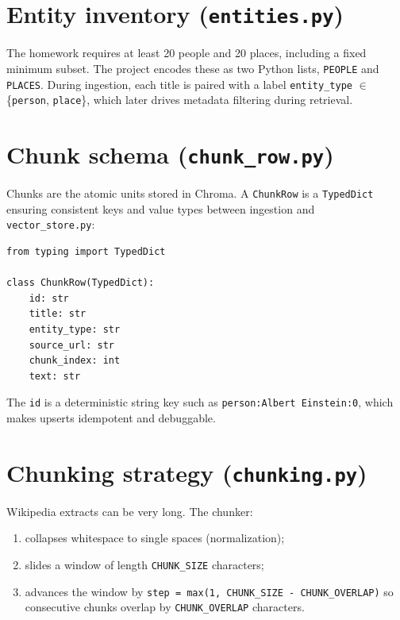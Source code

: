\documentclass[11pt,a4paper]{article}
\begin{document}
\section{Entity inventory (\texttt{entities.py})}

The homework requires at least 20 people and 20 places, including a fixed minimum subset.
The project encodes these as two Python lists, \texttt{PEOPLE} and \texttt{PLACES}.
During ingestion, each title is paired with a label \texttt{entity\_type} $\in$
\{\texttt{person}, \texttt{place}\}, which later drives metadata filtering during retrieval.

\section{Chunk schema (\texttt{chunk\_row.py})}

Chunks are the atomic units stored in Chroma. A \texttt{ChunkRow} is a \texttt{TypedDict}
ensuring consistent keys and value types between ingestion and \texttt{vector\_store.py}:

\begin{lstlisting}[caption={Chunk record schema (\texttt{chunk\_row.py}).},label={lst:chunkrow}]
from typing import TypedDict

class ChunkRow(TypedDict):
    id: str
    title: str
    entity_type: str
    source_url: str
    chunk_index: int
    text: str
\end{lstlisting}

\noindent
The \texttt{id} is a deterministic string key such as \texttt{person:Albert Einstein:0},
which makes upserts idempotent and debuggable.

\section{Chunking strategy (\texttt{chunking.py})}

Wikipedia extracts can be very long. The chunker:
\begin{enumerate}[leftmargin=*]
  \item collapses whitespace to single spaces (normalization);
  \item slides a window of length \texttt{CHUNK\_SIZE} characters;
  \item advances the window by \texttt{step = max(1, CHUNK\_SIZE - CHUNK\_OVERLAP)} so consecutive
        chunks overlap by \texttt{CHUNK\_OVERLAP} characters.
\end{enumerate}
\end{document}
